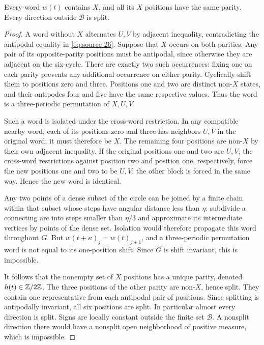 \begin{lemma}\label{lem:angular-words}
Every word \(w(t)\) contains \(X\), and all its \(X\) positions
have the same parity.  Every direction outside \(\mathcal B\)
is split.
\end{lemma}

\begin{proof}
A word without \(X\) alternates \(U,V\) by adjacent inequality,
contradicting the antipodal equality in \eqref{eq:source-26}.
Suppose that \(X\) occurs on both parities.  Any pair of its
opposite-parity positions must be antipodal, since otherwise
they are adjacent on the six-cycle.  There are exactly two
such occurrences: fixing one on each parity prevents any
additional occurrence on either parity.  Cyclically shift
them to positions zero and three.  Positions one and two
are distinct non-\(X\) states, and their antipodes four and
five have the same respective values.  Thus the word is a
three-periodic permutation of \(X,U,V\).

Such a word is isolated under the cross-word restriction.
In any compatible nearby word, each of its positions zero
and three has neighbors \(U,V\) in the original word; it
must therefore be \(X\).  The remaining four positions are
non-\(X\) by their own adjacent inequality.  If the original
positions one and two are \(U,V\), the cross-word restrictions
against position two and position one, respectively, force
the new positions one and two to be \(U,V\); the other block
is forced in the same way.  Hence the new word is identical.

Any two points of a dense subset of the circle can be joined
by a finite chain within that subset whose steps have angular
distance less than \(\eta\): subdivide a connecting arc into
steps smaller than \(\eta/3\) and approximate its intermediate
vertices by points of the dense set.  Isolation would therefore
propagate this word throughout \(G\).  But
\(w(t+\kappa)_j=w(t)_{j+1}\), and a three-periodic permutation
word is not equal to its one-position shift.  Since \(G\) is
shift invariant, this is impossible.

It follows that the nonempty set of \(X\) positions has a
unique parity, denoted \(h(t)\in\mathbb Z/2\mathbb Z\).  The three positions
of the other parity are non-\(X\), hence split.  They contain
one representative from each antipodal pair of positions.
Since splitting is antipodally invariant, all six positions
are split.  In particular almost every direction is split.
Signs are locally constant outside the finite set \(\mathcal B\).
A nonsplit direction there would have a nonsplit open
neighborhood of positive measure, which is impossible.
\end{proof}

